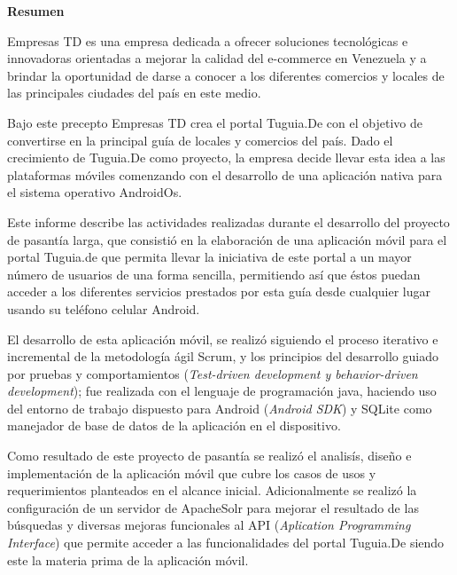 \setcounter{page}{4}
\begin{center}
	{\bf Resumen}
\end{center}	

Empresas TD es una empresa dedicada a ofrecer soluciones tecnológicas e innovadoras orientadas a mejorar la calidad del e-commerce en Venezuela y a brindar la oportunidad de darse a conocer a los diferentes comercios y locales de las principales ciudades del país en este medio.

Bajo este precepto Empresas TD crea el portal Tuguia.De con el objetivo de convertirse en la 
principal guía de locales y comercios del país. Dado el crecimiento de Tuguia.De como proyecto, la empresa decide llevar esta idea a las plataformas móviles comenzando con el desarrollo de una aplicación nativa para el sistema operativo AndroidOs. 

Este informe describe las actividades realizadas durante el desarrollo del proyecto de pasantía larga, que consistió en la elaboración de una aplicación móvil para el portal Tuguia.de que permita llevar la iniciativa de este portal a un mayor número de usuarios
de una forma sencilla, permitiendo así que éstos puedan acceder a los diferentes servicios prestados por esta guía desde cualquier lugar usando su teléfono celular Android.

El desarrollo de esta aplicación móvil, se realizó siguiendo el proceso iterativo e incremental de la metodología ágil Scrum, y los principios del desarrollo guiado por 
pruebas y comportamientos (\textit{Test-driven development y behavior-driven development}); 
fue realizada con el lenguaje de programación java, haciendo uso del entorno de trabajo 
dispuesto para Android (\textit{Android SDK}) y SQLite como manejador de base de datos de la aplicación en el dispositivo.

Como resultado de este proyecto de pasantía se realizó el analisís, diseño e implementación de la aplicación móvil que cubre los casos de usos y requerimientos planteados en el alcance inicial. Adicionalmente se realizó la configuración de un servidor de ApacheSolr para mejorar
el resultado de las búsquedas y diversas mejoras funcionales al API (\textit{Aplication Programming Interface}) que permite acceder a las funcionalidades del portal Tuguia.De siendo 
este la materia prima de la aplicación móvil.

